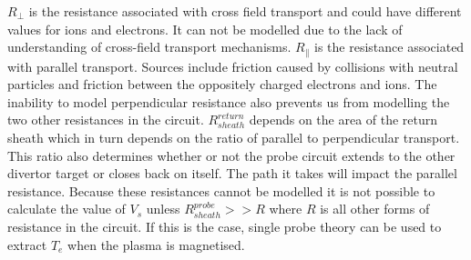$R_{\perp}$ is the resistance associated with cross field transport and could have different values for ions and electrons. It can not be modelled due to the lack of understanding of cross-field transport mechanisms. $R_{\parallel}$ is the resistance associated with parallel transport. Sources include friction caused by collisions with neutral particles and friction between the oppositely charged electrons and ions. The inability to model perpendicular resistance also prevents us from modelling the two other resistances in the circuit. $R^{return}_{sheath}$ depends on the area of the return sheath which in turn depends on the ratio of parallel to perpendicular transport. This ratio also determines whether or not the probe circuit extends to the other divertor target or closes back on itself. The path it takes will impact the parallel resistance. Because these resistances cannot be modelled it is not possible to calculate the value of $V_s$ unless $R_{sheath}^{probe} >> R$ where $R$ is all other forms of resistance in the circuit. If this is the case, single probe theory can be used to extract $T_e$ when the plasma is magnetised. 


